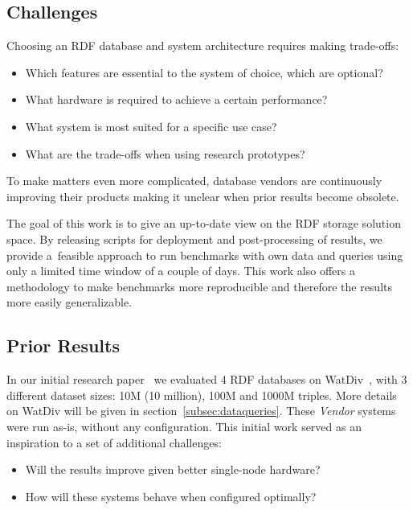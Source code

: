 \subsection{Challenges}

Choosing an RDF database and system architecture requires making trade-offs: 

\begin{itemize}
	\item Which features are essential to the system of choice, which are optional?
	\item What hardware is required to achieve a certain performance?
	\item What system is most suited for a specific use case?
	\item What are the trade-offs when using research prototypes? 
\end{itemize}

To make matters even more complicated, database vendors are continuously improving their products making it unclear when prior results become obsolete.

The goal of this work is to give an up-to-date view on the RDF storage solution space.
By releasing scripts for deployment and post-processing of results, we provide a~feasible approach to run benchmarks with own data and queries using only a limited time window of a couple of days.
This work also offers a methodology to make benchmarks more reproducible and therefore the results more easily generalizable.

\subsection{Prior Results}
In our initial research paper~\cite{de2016big} we evaluated 4 RDF databases on WatDiv~\cite{alucc2014diversified}, with 3 different dataset sizes: 10M (10 million), 100M and 1000M triples. More details on WatDiv will be given in section~\ref{subsec:dataqueries}. These \emph{Vendor} systems were run as-is, without any configuration. 
This initial work served as an inspiration to a set of additional challenges:

\begin{itemize}
\item Will the results improve given better single-node hardware?
\item How will these systems behave when configured optimally?
\end{itemize}


